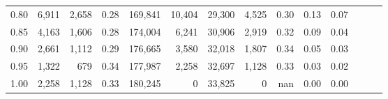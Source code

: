 \begin{tabular}{rrrrrrrrrrrrrr}
0.80 &   6,911 &  2,658 &  0.28 &  169,841 &   10,404 &  29,300 &   4,525 &  0.30 &  0.13 &      0.07 \\
0.85 &   4,163 &  1,606 &  0.28 &  174,004 &    6,241 &  30,906 &   2,919 &  0.32 &  0.09 &      0.04 \\
0.90 &   2,661 &  1,112 &  0.29 &  176,665 &    3,580 &  32,018 &   1,807 &  0.34 &  0.05 &      0.03 \\
0.95 &   1,322 &    679 &  0.34 &  177,987 &    2,258 &  32,697 &   1,128 &  0.33 &  0.03 &      0.02 \\
1.00 &   2,258 &  1,128 &  0.33 &  180,245 &        0 &  33,825 &       0 &   nan &  0.00 &      0.00 \\
\bottomrule
\end{tabular}
